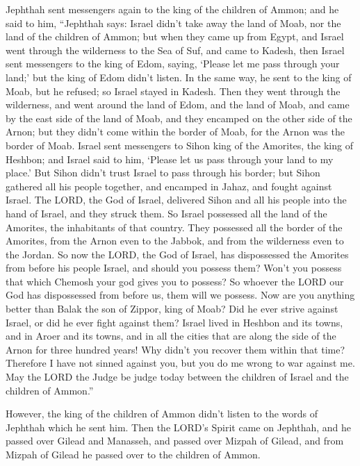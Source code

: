 \myverse{}Jephthah sent messengers again to the king of the children of
Ammon;
\myverse{}and he said to him, “Jephthah says: Israel didn’t take away the land of Moab,
nor the land of the children of Ammon;
\myverse{}but when they came up from Egypt, and Israel went through the wilderness
to the Sea of Suf, and came to Kadesh,
\myverse{}then Israel sent messengers to the king of Edom, saying, ‘Please let me pass
through your land;’ but the king of Edom didn’t listen. In the same way, he sent to the king of Moab,
but he refused; so Israel stayed in Kadesh.
\myverse{}Then they went through the wilderness, and went around the land of Edom,
and the land of Moab, and came by the east side of the land of Moab, and they encamped on the other side
of the Arnon; but they didn’t come within the border of Moab, for the Arnon was the border of Moab.
\myverse{}Israel sent messengers to Sihon king of the Amorites, the king of Heshbon;
and Israel said to him, ‘Please let us pass through your land to my place.’
\myverse{}But Sihon didn’t trust Israel to pass through his border; but Sihon gathered
all his people together, and encamped in Jahaz, and fought against Israel.
\myverse{}The LORD, the God of Israel, delivered Sihon and all his people into the
hand of Israel, and they struck them. So Israel possessed all the land of the Amorites, the inhabitants
of that country.
\myverse{}They possessed all the border of the Amorites, from the Arnon even to the
Jabbok, and from the wilderness even to the Jordan.
\myverse{}So now the LORD, the God of Israel, has dispossessed the Amorites from before
his people Israel, and should you possess them?
\myverse{}Won’t you possess that which Chemosh your god gives you to possess? So whoever
the LORD our God has dispossessed from before us, them will we possess.
\myverse{}Now are you anything better than Balak the son of Zippor, king of Moab? Did
he ever strive against Israel, or did he ever fight against them?
\myverse{}Israel lived in Heshbon and its towns, and in Aroer and its towns, and in
all the cities that are along the side of the Arnon for three hundred years! Why didn’t you recover them
within that time?
\myverse{}Therefore I have not sinned against you, but you do me wrong to war against
me. May the LORD the Judge be judge today between the children of Israel and the children of Ammon.”

\myverse{}However, the king of the children of Ammon didn’t listen to
the words of Jephthah which he sent him.
\myverse{}Then the LORD’s Spirit came on Jephthah, and he passed over Gilead and Manasseh,
and passed over Mizpah of Gilead, and from Mizpah of Gilead he passed over to the children of Ammon.

